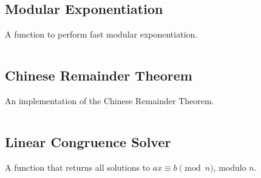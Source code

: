 \documentclass[9pt,a4paper]{amsart}
\newcommand{\code}[1]{\inputminted[linenos]{cpp}{_code/#1}}
\begin{document}
    \subsection{Modular Exponentiation}
        A function to perform fast modular exponentiation.
        \code{mathematics/mod_pow.cpp}

    \subsection{Chinese Remainder Theorem}
        An implementation of the Chinese Remainder Theorem.
        \code{mathematics/crt.cpp}

    \subsection{Linear Congruence Solver}
        A function that returns all solutions to $ax \equiv b \pmod{n}$, modulo $n$.
        \code{mathematics/linear_congruence.cpp}
\end{document}
